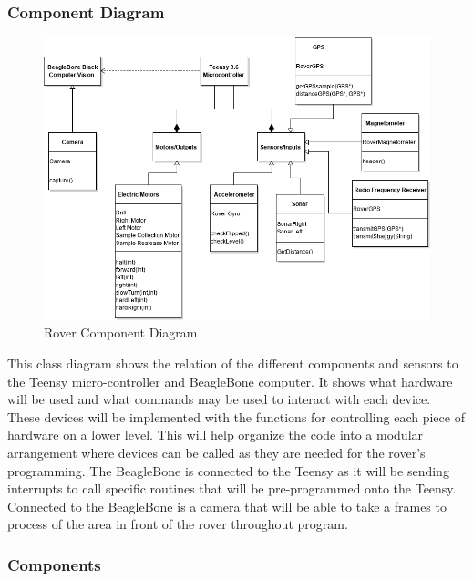 \documentclass[onecolumn, draftclsnofoot, 10pt, compsoc]{IEEEtran}
\begin{document}
\subsubsection{Component Diagram}
\vspace{1cm}
\begin{figure}[ht]
    \centering
    \includegraphics[width = 1 \textwidth,angle=0]{Figures/ClassDiag.png}
    \caption{Rover Component Diagram}
    \label{fig:my_label}
\end{figure}
\vspace{1cm}

This class diagram shows the relation of the different components and sensors to the Teensy micro-controller and BeagleBone computer. It shows what hardware will be used and what commands may be used to interact with each device. These devices will be implemented with the functions for controlling each piece of hardware on a lower level. This will help organize the code into a modular arrangement where devices can be called as they are needed for the rover's programming. The BeagleBone is connected to the Teensy as it will be sending interrupts to call specific routines that will be pre-programmed onto the Teensy. Connected to the BeagleBone is a camera that will be able to take a frames to process of the area in front of the rover throughout program.

\subsubsection{Components}
\end{document}
